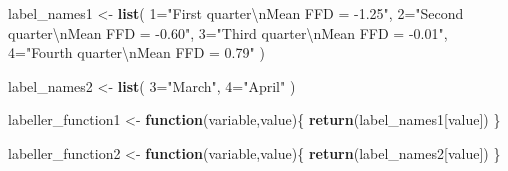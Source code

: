 \documentclass[
]{article}
\newenvironment{Shaded}{\begin{snugshade}}{\end{snugshade}}
\newcommand{\CharTok}[1]{\textcolor[rgb]{0.31,0.60,0.02}{#1}}
\newcommand{\ControlFlowTok}[1]{\textcolor[rgb]{0.13,0.29,0.53}{\textbf{#1}}}
\newcommand{\KeywordTok}[1]{\textcolor[rgb]{0.13,0.29,0.53}{\textbf{#1}}}
\newcommand{\NormalTok}[1]{#1}
\newcommand{\StringTok}[1]{\textcolor[rgb]{0.31,0.60,0.02}{#1}}
\begin{document}
\begin{Shaded}
\begin{Highlighting}[]
\NormalTok{label\_names1 \textless{}{-}}\StringTok{ }\KeywordTok{list}\NormalTok{(}
  \StringTok{\textquotesingle{}1\textquotesingle{}}\NormalTok{=}\StringTok{"First quarter}\CharTok{\textbackslash{}n}\StringTok{Mean FFD = {-}1.25"}\NormalTok{,}
  \StringTok{\textquotesingle{}2\textquotesingle{}}\NormalTok{=}\StringTok{"Second quarter}\CharTok{\textbackslash{}n}\StringTok{Mean FFD = {-}0.60"}\NormalTok{,}
  \StringTok{\textquotesingle{}3\textquotesingle{}}\NormalTok{=}\StringTok{"Third quarter}\CharTok{\textbackslash{}n}\StringTok{Mean FFD = {-}0.01"}\NormalTok{,}
  \StringTok{\textquotesingle{}4\textquotesingle{}}\NormalTok{=}\StringTok{"Fourth quarter}\CharTok{\textbackslash{}n}\StringTok{Mean FFD = 0.79"}
\NormalTok{)}

\NormalTok{label\_names2 \textless{}{-}}\StringTok{ }\KeywordTok{list}\NormalTok{(}
  \StringTok{\textquotesingle{}3\textquotesingle{}}\NormalTok{=}\StringTok{"March"}\NormalTok{,}
  \StringTok{\textquotesingle{}4\textquotesingle{}}\NormalTok{=}\StringTok{"April"}
\NormalTok{)}

\NormalTok{labeller\_function1 \textless{}{-}}\StringTok{ }\ControlFlowTok{function}\NormalTok{(variable,value)\{}
  \KeywordTok{return}\NormalTok{(label\_names1[value])}
\NormalTok{\}}

\NormalTok{labeller\_function2 \textless{}{-}}\StringTok{ }\ControlFlowTok{function}\NormalTok{(variable,value)\{}
  \KeywordTok{return}\NormalTok{(label\_names2[value])}
\NormalTok{\}}
\end{Highlighting}
\end{Shaded}
\end{document}
